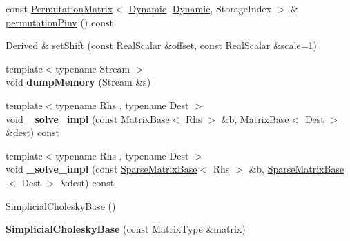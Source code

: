 \begin{DoxyCompactItemize}
\item 
const \hyperlink{group___core___module_class_eigen_1_1_permutation_matrix}{Permutation\+Matrix}$<$ \hyperlink{namespace_eigen_ad81fa7195215a0ce30017dfac309f0b2}{Dynamic}, \hyperlink{namespace_eigen_ad81fa7195215a0ce30017dfac309f0b2}{Dynamic}, Storage\+Index $>$ \& \hyperlink{group___sparse_cholesky___module_a0e23d1f4a88c211be7098faf1cb41674}{permutation\+Pinv} () const
\item 
Derived \& \hyperlink{group___sparse_cholesky___module_a362352f755101faaac59c1ed9d5e3559}{set\+Shift} (const Real\+Scalar \&offset, const Real\+Scalar \&scale=1)
\item 
\mbox{\label{group___sparse_cholesky___module_a61efd39e3f15e6864552953bdd4f29c7}} 
{\footnotesize template$<$typename Stream $>$ }\\void {\bfseries dump\+Memory} (Stream \&s)
\item 
\mbox{\label{group___sparse_cholesky___module_a37ab9aaf6c2cbb4cc15ecbba7e424c74}} 
{\footnotesize template$<$typename Rhs , typename Dest $>$ }\\void {\bfseries \+\_\+solve\+\_\+impl} (const \hyperlink{group___core___module_class_eigen_1_1_matrix_base}{Matrix\+Base}$<$ Rhs $>$ \&b, \hyperlink{group___core___module_class_eigen_1_1_matrix_base}{Matrix\+Base}$<$ Dest $>$ \&dest) const
\item 
\mbox{\label{group___sparse_cholesky___module_a64793e46e9815288b9a429cc7b63a6bb}} 
{\footnotesize template$<$typename Rhs , typename Dest $>$ }\\void {\bfseries \+\_\+solve\+\_\+impl} (const \hyperlink{group___sparse_core___module_class_eigen_1_1_sparse_matrix_base}{Sparse\+Matrix\+Base}$<$ Rhs $>$ \&b, \hyperlink{group___sparse_core___module_class_eigen_1_1_sparse_matrix_base}{Sparse\+Matrix\+Base}$<$ Dest $>$ \&dest) const
\item 
\hyperlink{group___sparse_cholesky___module_a098baba1dbe07ca3a775c8df1f8a0e71}{Simplicial\+Cholesky\+Base} ()
\item 
\mbox{\label{group___sparse_cholesky___module_a90bd237828d21cb509c815f2787153b2}} 
{\bfseries Simplicial\+Cholesky\+Base} (const Matrix\+Type \&matrix)
\item 

\end{DoxyCompactItemize}
